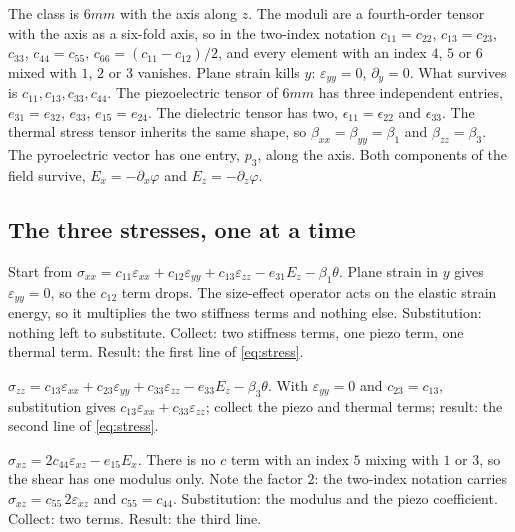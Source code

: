 \documentclass[11pt]{article}
\makeatletter
\newif\ifshowworked
\newenvironment{worked}{%
  \ifshowworked\par\smallskip\noindent\textit{Working.}\par\smallskip\else
  \setbox\z@\vbox\bgroup\fi}{\ifshowworked\par\smallskip\else\egroup\fi}
\makeatother
\begin{document}
\begin{worked}
The class is $6mm$ with the axis along $z$. The moduli are a fourth-order tensor with the axis as a
six-fold axis, so in the two-index notation $c_{11}=c_{22}$, $c_{13}=c_{23}$, $c_{33}$, $c_{44}=c_{55}$,
$c_{66}=(c_{11}-c_{12})/2$, and every element with an index $4$, $5$ or $6$ mixed with $1$, $2$ or $3$
vanishes. Plane strain kills $y$: $\varepsilon_{yy}=0$, $\partial_y=0$. What survives is
$c_{11},c_{13},c_{33},c_{44}$.
The piezoelectric tensor of $6mm$ has three independent entries, $e_{31}=e_{32}$, $e_{33}$, $e_{15}=e_{24}$.
The dielectric tensor has two, $\epsilon_{11}=\epsilon_{22}$ and $\epsilon_{33}$. The thermal stress tensor
inherits the same shape, so $\beta_{xx}=\beta_{yy}=\beta_1$ and $\beta_{zz}=\beta_3$. The pyroelectric
vector has one entry, $p_3$, along the axis.
Both components of the field survive, $E_x=-\partial_x\varphi$ and $E_z=-\partial_z\varphi$.
\end{worked}

\subsection*{The three stresses, one at a time}

\begin{worked}
Start from $\sigma_{xx}=c_{11}\varepsilon_{xx}+c_{12}\varepsilon_{yy}+c_{13}\varepsilon_{zz}
-e_{31}E_z-\beta_1\theta$. Plane strain in $y$ gives $\varepsilon_{yy}=0$, so the $c_{12}$ term drops.
The size-effect operator acts on the elastic strain energy, so it multiplies the two stiffness terms and
nothing else. Substitution: nothing left to substitute. Collect: two stiffness terms, one piezo term, one
thermal term. Result: the first line of \eqref{eq:stress}.
\end{worked}

\begin{worked}
$\sigma_{zz}=c_{13}\varepsilon_{xx}+c_{23}\varepsilon_{yy}+c_{33}\varepsilon_{zz}-e_{33}E_z
-\beta_3\theta$. With $\varepsilon_{yy}=0$ and $c_{23}=c_{13}$, substitution gives
$c_{13}\varepsilon_{xx}+c_{33}\varepsilon_{zz}$; collect the piezo and thermal terms; result: the second
line of \eqref{eq:stress}.
\end{worked}

\begin{worked}
$\sigma_{xz}=2c_{44}\varepsilon_{xz}-e_{15}E_x$. There is no $c$ term with an index $5$ mixing with $1$
or $3$, so the shear has one modulus only. Note the factor $2$: the two-index notation carries
$\sigma_{xz}=c_{55}\,2\varepsilon_{xz}$ and $c_{55}=c_{44}$. Substitution: the modulus and the piezo
coefficient. Collect: two terms. Result: the third line.
\end{worked}
\end{document}
